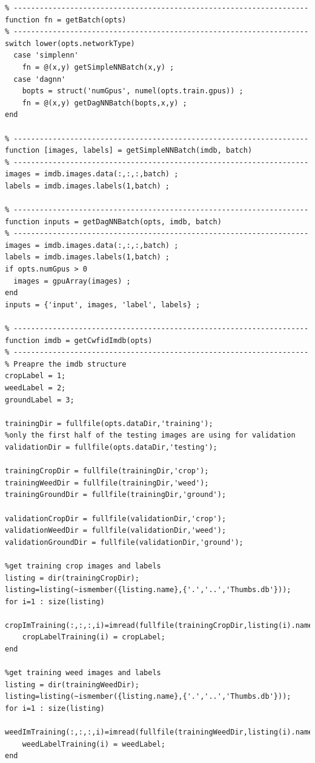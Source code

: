 \documentclass[]{report}
\begin{document}
\begin{lstlisting}
% --------------------------------------------------------------------
function fn = getBatch(opts)
% --------------------------------------------------------------------
switch lower(opts.networkType)
  case 'simplenn'
    fn = @(x,y) getSimpleNNBatch(x,y) ;
  case 'dagnn'
    bopts = struct('numGpus', numel(opts.train.gpus)) ;
    fn = @(x,y) getDagNNBatch(bopts,x,y) ;
end

% --------------------------------------------------------------------
function [images, labels] = getSimpleNNBatch(imdb, batch)
% --------------------------------------------------------------------
images = imdb.images.data(:,:,:,batch) ;
labels = imdb.images.labels(1,batch) ;

% --------------------------------------------------------------------
function inputs = getDagNNBatch(opts, imdb, batch)
% --------------------------------------------------------------------
images = imdb.images.data(:,:,:,batch) ;
labels = imdb.images.labels(1,batch) ;
if opts.numGpus > 0
  images = gpuArray(images) ;
end
inputs = {'input', images, 'label', labels} ;

% --------------------------------------------------------------------
function imdb = getCwfidImdb(opts)
% --------------------------------------------------------------------
% Preapre the imdb structure
cropLabel = 1;
weedLabel = 2;
groundLabel = 3;

trainingDir = fullfile(opts.dataDir,'training');
%only the first half of the testing images are using for validation
validationDir = fullfile(opts.dataDir,'testing');

trainingCropDir = fullfile(trainingDir,'crop');
trainingWeedDir = fullfile(trainingDir,'weed');
trainingGroundDir = fullfile(trainingDir,'ground');

validationCropDir = fullfile(validationDir,'crop');
validationWeedDir = fullfile(validationDir,'weed');
validationGroundDir = fullfile(validationDir,'ground');

%get training crop images and labels
listing = dir(trainingCropDir);
listing=listing(~ismember({listing.name},{'.','..','Thumbs.db'}));
for i=1 : size(listing)
    cropImTraining(:,:,:,i)=imread(fullfile(trainingCropDir,listing(i).name));
    cropLabelTraining(i) = cropLabel;
end

%get training weed images and labels
listing = dir(trainingWeedDir);
listing=listing(~ismember({listing.name},{'.','..','Thumbs.db'}));
for i=1 : size(listing)
    weedImTraining(:,:,:,i)=imread(fullfile(trainingWeedDir,listing(i).name));
    weedLabelTraining(i) = weedLabel;
end


\end{lstlisting}
\end{document}
